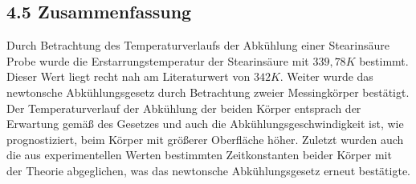 \documentclass[a4paper]{article}
\begin{document}
\subsection*{4.5 Zusammenfassung}
Durch Betrachtung des Temperaturverlaufs der Abkühlung einer Stearinsäure Probe wurde die Erstarrungstemperatur der Stearinsäure mit  $339,78K$ bestimmt. Dieser Wert liegt recht nah am Literaturwert von $342K$.
Weiter wurde das newtonsche Abkühlungsgesetz durch Betrachtung zweier Messingkörper bestätigt. Der Temperaturverlauf der Abkühlung der beiden Körper entsprach der Erwartung gemäß des Gesetzes und auch die Abkühlungsgeschwindigkeit ist, wie prognostiziert, beim Körper mit größerer Oberfläche höher.
Zuletzt wurden auch die aus experimentellen Werten bestimmten Zeitkonstanten beider Körper mit der Theorie abgeglichen, was das newtonsche Abkühlungsgesetz erneut bestätigte.
\newpage

\end{document}
